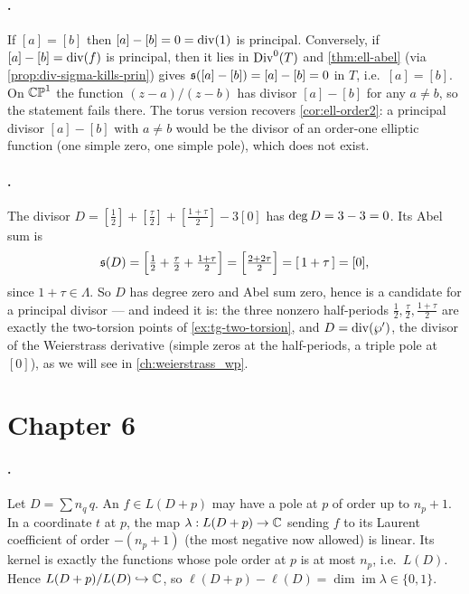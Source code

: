 \paragraph{.}
If \([a] = [b]\) then \([a] - [b] = 0 = \operatorname{div}(1)\) is principal. Conversely, if
\([a] - [b] = \operatorname{div}(f)\) is principal, then it lies in \(\operatorname{Div}^0(T)\) and
\cref{thm:ell-abel} (via \cref{prop:div-sigma-kills-prin}) gives
\(\mathfrak{s}([a]-[b]) = [a] - [b] = 0\) in \(T\), i.e.\ \([a] = [b]\). On \(\mathbb{CP}^1\)
the function \((z-a)/(z-b)\) has divisor \([a] - [b]\) for any \(a \ne b\), so the
statement fails there. The torus version recovers \cref{cor:ell-order2}: a
principal divisor \([a] - [b]\) with \(a \ne b\) would be the divisor of an
order-one elliptic function (one simple zero, one simple pole), which does not
exist.

\paragraph{.}
The divisor \(D = [\tfrac12] + [\tfrac{\tau}{2}] + [\tfrac{1+\tau}{2}] - 3[0]\)
has \(\operatorname{deg} D = 3 - 3 = 0\). Its Abel sum is
\[
  \mathfrak{s}(D) = \Bigl[\tfrac12 + \tfrac{\tau}{2} + \tfrac{1+\tau}{2}\Bigr]
  = \Bigl[\tfrac{2 + 2\tau}{2}\Bigr] = [\,1 + \tau\,] = [0],
\]
since \(1 + \tau \in \Lambda\). So \(D\) has degree zero and Abel sum zero, hence
is a candidate for a principal divisor --- and indeed it is: the three nonzero
half-periods \(\tfrac12, \tfrac{\tau}{2}, \tfrac{1+\tau}{2}\) are exactly the
two-torsion points of \cref{ex:tg-two-torsion}, and \(D = \operatorname{div}(\wp')\), the
divisor of the Weierstrass derivative (simple zeros at the half-periods, a
triple pole at \([0]\)), as we will see in \cref{ch:weierstrass_wp}.

\section{Chapter 6}
\label{sec:soln-ch6}

\paragraph{.}
Let \(D = \sum n_q\,q\). An \(f \in L(D+p)\) may have a pole at \(p\) of order up
to \(n_p + 1\). In a coordinate \(t\) at \(p\), the map
\(\lambda : L(D+p) \to \mathbb{C}\) sending \(f\) to its Laurent coefficient of order
\(-(n_p+1)\) (the most negative now allowed) is linear. Its kernel is exactly the
functions whose pole order at \(p\) is at most \(n_p\), i.e.\ \(L(D)\). Hence
\(L(D+p)/L(D) \hookrightarrow \mathbb{C}\), so \(\ell(D+p) - \ell(D) = \dim\operatorname{im}\lambda
\in \{0,1\}\).

